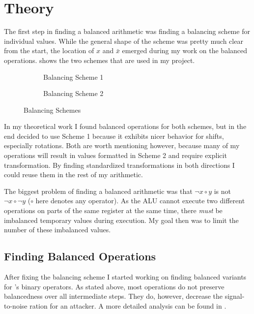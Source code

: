 \section{Theory}
\label{arithmetic}
The first step in finding a balanced arithmetic was finding a balancing scheme for individual values.
While the general shape of the scheme was pretty much clear from the start, the location of $x$ and $\bar{x}$ emerged during my work on the balanced operations.
 shows the two schemes that are used in my project.

\begin{figure}[h]
  \centering
  \begin{subfigure}{.49\linewidth}
    \centering
    \caption{Balancing Scheme 1}
    \label{fig:scheme1}
  \end{subfigure}
  \begin{subfigure}{0.49\linewidth}
    \centering
    \caption{Balancing Scheme 2}
  \end{subfigure}
  \caption{Balancing Schemes}
  \label{fig:schemes}
\end{figure}

In my theoretical work I found balanced operations for both schemes, but in the end decided to use Scheme 1 because it exhibits nicer behavior for shifts, especially rotations.
Both are worth mentioning however, because many of my operations will result in values formatted in Scheme 2 and require explicit transformation.
By finding standardized transformations in both directions I could reuse them in the rest of my arithmetic.

The biggest problem of finding a balanced arithmetic was that $\neg{x \circ y}$ is not $\neg{x} \circ \neg{y}$ ($\circ$ here denotes any operator).
As the ALU cannot execute two different operations on parts of the same register at the same time, there \emph{must} be imbalanced temporary values during execution.
My goal then was to limit the number of these imbalanced values.

\subsection{Finding Balanced Operations}
\label{operations}
After fixing the balancing scheme I started working on finding balanced variants for \ir{}'s binary operators.
As stated above, most operations do not preserve balancedness over all intermediate steps.
They do, however, decrease the signal-to-noise ration for an attacker.
A more detailed analysis can be found in .

